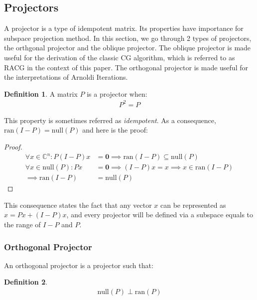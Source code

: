 \documentclass[]{article}
\theoremstyle{definition}
\newtheorem{definition}{Definition}
\begin{document}
    \subsection{Projectors}
        A projector is a type of idempotent matrix. Its properties have importance for subspace projection method. In this section, we go through 2 types of projectors, the orthgonal projector and the oblique projector. The oblique projector is made useful for the derivation of the classic CG algorithm, which is referred to as RACG in the context of this paper. The orthogonal projector is made useful for the interpretations of Arnoldi Iterations. 
        \begin{definition}
            A matrix $P$ is a projector when: 
            \begin{align}
                P^2 = P
            \end{align}    
        \end{definition}
        This property is sometimes referred as \textit{idempotent}. As a consequence, $\text{ran}(I - P) = \text{null}(P)$ and here is the proof: 
        \begin{proof}
            \begin{align}
                \forall x \in \mathbb{C}^n: P(I - P)x &= \mathbf{0} \implies \text{ran}(I - P)\subseteq \text{null}(P)
                \\
                \forall x \in \text{null}(P): Px &= \mathbf{0} \implies (I - P)x = x \implies x \in \text{ran}(I - P)
                \\
                \implies \text{ran}(I - P) &= \text{null}(P)
                \label{a:1.1.4}
            \end{align}
        \end{proof}
        \noindent
        This consequence states the fact that any vector $x$ can be represented as $x = Px + (I - P)x$, and every projector will be defined via a subspace equals to the range of $I - P$ and $P$. 
        
        \subsubsection{Orthogonal Projector}
            An orthogonal projector is a projector such that: 
            \begin{definition}
                \begin{align}
                    \text{null}(P) \perp \text{ran}(P)
                \end{align}    
            \end{definition}
            
\end{document}
